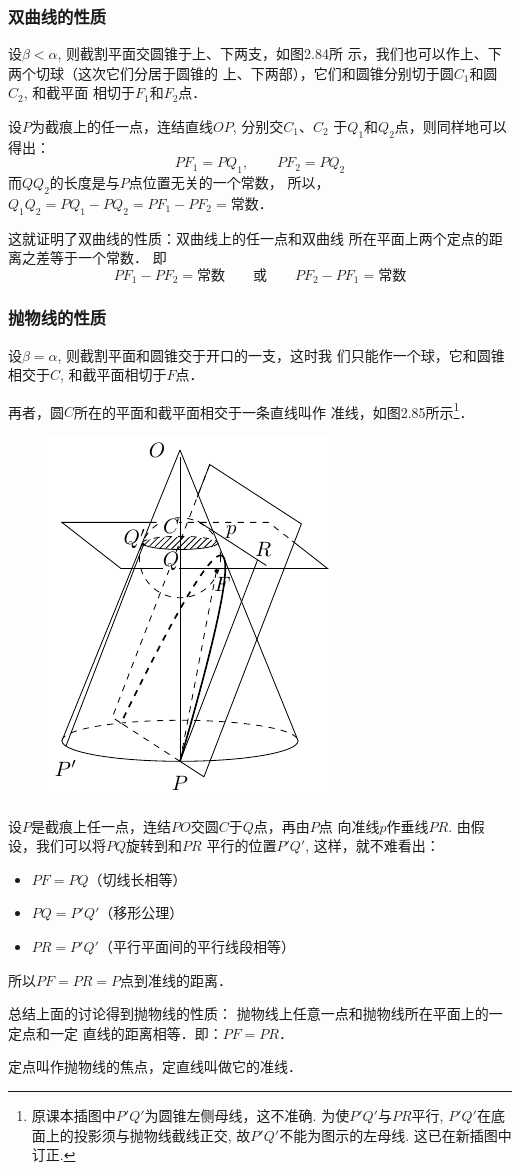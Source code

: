 \subsubsection{双曲线的性质}
设$\beta<\alpha$, 则截割平面交圆锥于上、下两支，如图2.84所
示，我们也可以作上、下两个切球（这次它们分居于圆锥的
上、下两部），它们和圆锥分别切于圆$C_1$和圆$C_2$, 和截平面
相切于$F_1$和$F_2$点．

设$P$为截痕上的任一点，连结直线$OP$, 分别交$C_1$、$C_2$
于$Q_1$和$Q_2$点，则同样地可以得出：
\[PF_1=PQ_1,\qquad PF_2=PQ_2\]
而$QQ_2$的长度是与$P$点位置无关的一个常数，
所以，$Q_1Q_2=PQ_1-PQ_2=PF_1-PF_2=$常数．

这就证明了双曲线的性质：双曲线上的任一点和双曲线
所在平面上两个定点的距离之差等于一个常数．
即
\[PF_1-PF_2=\text{常数}\qquad \text{或}\qquad PF_2-PF_1=\text{常数}\]


\subsubsection{抛物线的性质}
设$\beta=\alpha$, 则截割平面和圆锥交于开口的一支，这时我
们只能作一个球，它和圆锥相交于$C$, 和截平面相切于$F$点．

再者，圆$C$所在的平面和截平面相交于一条直线叫作
准线，如图2.85所示\footnote{原课本插图中$P'Q'$为圆锥左侧母线，这不准确. 为使$P'Q'$与$PR$平行, $P'Q'$在底面上的投影须与抛物线截线正交, 故$P'Q'$不能为图示的左母线. 这已在新插图中订正.}．
\begin{figure}[ht]
    \centering
    \includegraphics{2-conic-section-parabola.pdf}
    \caption{}
\end{figure}

设$P$是截痕上任一点，连结$PO$交圆$C$于$Q$点，再由$P$点
向准线$p$作垂线$PR$. 由假设，我们可以将$PQ$旋转到和$PR$
平行的位置$P'Q'$, 这样，就不难看出：
\begin{itemize}
    \item $PF=PQ$（切线长相等）
    \item $PQ=P'Q'$（移形公理）
    \item $PR=P'Q'$（平行平面间的平行线段相等）
\end{itemize}

所以$PF=PR=P$点到准线的距离．

总结上面的讨论得到抛物线的性质：
抛物线上任意一点和抛物线所在平面上的一定点和一定
直线的距离相等．即：$PF=PR$．

定点叫作抛物线的焦点，定直线叫做它的准线．

